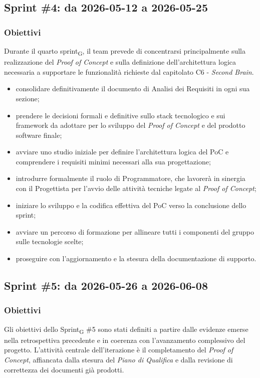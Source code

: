 ﻿\documentclass[a4paper, 10pt, colorlinks=true, linkcolor=black, urlcolor=blue, citecolor=blue, hidelinks]{article}
\begin{document}
\subsection{Sprint \#4: da 2026-05-12 a 2026-05-25}

\subsubsection{Obiettivi}

Durante il quarto sprint\textsubscript{G}, il team prevede di concentrarsi principalmente sulla realizzazione del \textit{Proof of Concept} e sulla definizione dell'architettura logica necessaria a supportare le funzionalità richieste dal capitolato C6 - \textit{Second Brain}.
\begin{itemize}
    \item consolidare definitivamente il documento di Analisi dei Requisiti in ogni sua sezione;
    \item prendere le decisioni formali e definitive sullo stack tecnologico e sui framework da adottare per lo sviluppo del \textit{Proof of Concept} e del prodotto software finale;
    \item avviare uno studio iniziale per definire l'architettura logica del PoC e comprendere i requisiti minimi necessari alla sua progettazione;
    \item introdurre formalmente il ruolo di Programmatore, che lavorerà in sinergia con il Progettista per l'avvio delle attività tecniche legate al \textit{Proof of Concept};
    \item iniziare lo sviluppo e la codifica effettiva del PoC verso la conclusione dello sprint;
    \item avviare un percorso di formazione per allineare tutti i componenti del gruppo sulle tecnologie scelte;
    \item proseguire con l'aggiornamento e la stesura della documentazione di supporto.
\end{itemize}

\subsection{Sprint \#5: da 2026-05-26 a 2026-06-08}

\subsubsection{Obiettivi}
Gli obiettivi dello Sprint\textsubscript{G} \#5 sono stati definiti a partire dalle evidenze emerse nella retrospettiva precedente e in coerenza con l'avanzamento complessivo del progetto. L'attività centrale dell'iterazione è il completamento del \textit{Proof of Concept}, affiancata dalla stesura del \textit{Piano di Qualifica} e dalla revisione di correttezza dei documenti già prodotti.
\end{document}
